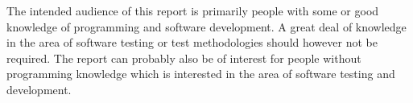 The intended audience of this report is primarily people with some or
good knowledge of programming and software development. A great deal of
knowledge in the area of software testing or test methodologies should
however not be required. The report can probably also be of interest for
people without programming knowledge which is interested in the area of
software testing and development.\\
